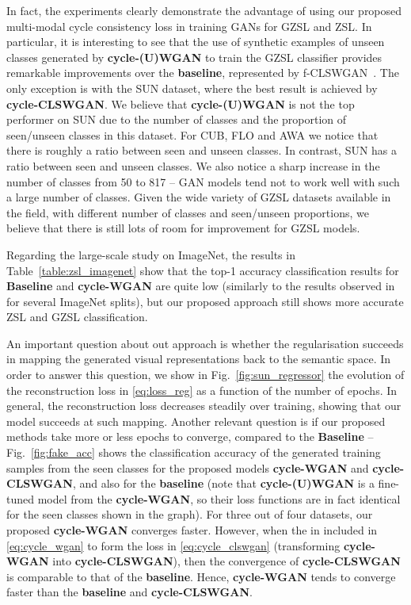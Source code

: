 \documentclass[runningheads]{llncs}
\begin{document}
In fact, the experiments clearly demonstrate the advantage of using our proposed multi-modal cycle consistency loss in training GANs for GZSL and ZSL.  In particular, it is interesting to see that the use of synthetic examples of unseen classes generated by \textbf{cycle-(U)WGAN} to train the GZSL classifier provides remarkable improvements over the \textbf{baseline}, represented by f-CLSWGAN~\cite{XianCVPR2018}.  The only exception is with the SUN dataset, where the best result is achieved by \textbf{cycle-CLSWGAN}.  We believe that \textbf{cycle-(U)WGAN} is not the top performer on SUN due to the number of classes and the proportion of seen/unseen classes in this dataset. For CUB, FLO and AWA we notice that there is roughly a  ratio between seen and unseen classes.  In contrast, SUN has a  ratio between seen and unseen classes. We also notice a sharp increase in the number of classes from 50 to 817 -- GAN models tend not to work well with such a large number of classes. 
Given the wide variety of GZSL datasets available in the field, with different number of classes and seen/unseen proportions, we believe that there is still lots of room for improvement for GZSL models.

Regarding the large-scale study on ImageNet, the results in Table~\ref{table:zsl_imagenet} show that the top-1 accuracy classification
results for \textbf{Baseline} and \textbf{cycle-WGAN} are quite low (similarly to the results observed in~\cite{XianCVPR2018} for several ImageNet splits),
but our proposed approach still shows more accurate ZSL and GZSL classification.


An important question about out approach is whether the regularisation succeeds in mapping the generated visual representations back to the semantic space.  In order to answer this question, we show in Fig.~\ref{fig:sun_regressor} the evolution of the reconstruction loss  in \eqref{eq:loss_reg} as a function of the number of epochs.  In general, the reconstruction loss decreases steadily over training, showing that our model succeeds at such mapping.
Another relevant question is if our proposed methods take more or less epochs to converge, compared to the \textbf{Baseline} -- Fig.~\ref{fig:fake_acc} shows the classification accuracy of the generated training samples from the seen classes for the proposed models \textbf{cycle-WGAN} and \textbf{cycle-CLSWGAN}, and also for the \textbf{baseline} (note that \textbf{cycle-(U)WGAN} is a fine-tuned model from the \textbf{cycle-WGAN}, so their loss functions are in fact identical for the seen classes shown in the graph).  For three out of four datasets, our proposed \textbf{cycle-WGAN} converges faster. However, when the  in included in \eqref{eq:cycle_wgan} to form the loss in \eqref{eq:cycle_clswgan} (transforming \textbf{cycle-WGAN} into \textbf{cycle-CLSWGAN}), then the convergence of \textbf{cycle-CLSWGAN} is comparable to that of the \textbf{baseline}.  Hence, \textbf{cycle-WGAN} tends to converge faster than the \textbf{baseline} and \textbf{cycle-CLSWGAN}.
\end{document}
